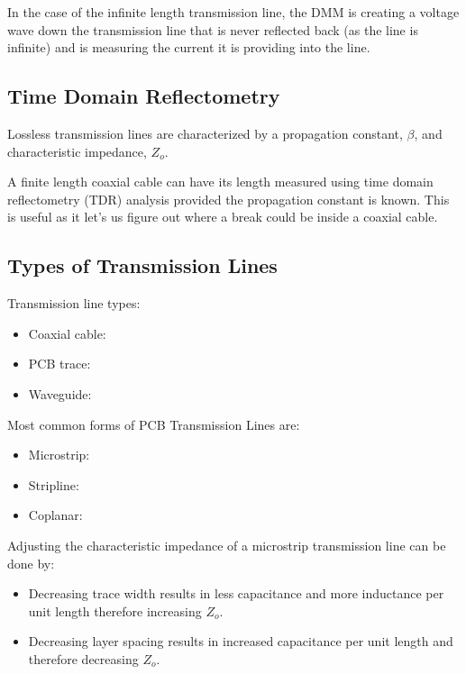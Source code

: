 \documentclass[main.tex]{subfiles}
\begin{document}
In the case of the infinite length transmission line, the DMM is creating a voltage wave down the transmission line that is never reflected back (as the line is infinite) and is measuring the current it is providing into the line. 

\subsection{Time Domain Reflectometry}
Lossless transmission lines are characterized by a propagation constant, $\beta$, and characteristic impedance, $Z_o$. 

A finite length coaxial cable can have its length measured using time domain reflectometry (TDR) analysis provided the propagation constant is known. This is useful as it let's us figure out where a break could be inside a coaxial cable. 


\subsection{Types of Transmission Lines}
Transmission line types:
\begin{itemize}
    \item Coaxial cable: 
    \item PCB trace:
    \item Waveguide: 
\end{itemize}

Most common forms of PCB Transmission Lines are:
\begin{itemize}
    \item Microstrip: 
    \item Stripline: 
    \item Coplanar: 
\end{itemize}

Adjusting the characteristic impedance of a microstrip transmission line can be done by:
\begin{itemize}
    \item Decreasing trace width results in less capacitance and more inductance per unit length therefore increasing $Z_o$.
    \item Decreasing layer spacing results in increased capacitance per unit length and therefore decreasing $Z_o$.
\end{itemize}
\end{document}
